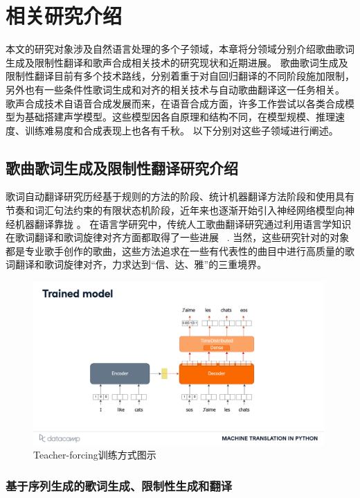 \chapter{相关研究介绍}
本文的研究对象涉及自然语言处理的多个子领域，本章将分领域分别介绍歌曲歌词生成及限制性翻译和歌声合成相关技术的研究现状和近期进展。
歌曲歌词生成及限制性翻译目前有多个技术路线，分别着重于对自回归翻译的不同阶段施加限制，另外也有一些条件性歌词生成和对齐的相关技术与自动歌曲翻译这一任务相关。
歌声合成技术自语音合成发展而来，在语音合成方面，许多工作尝试以各类合成模型为基础搭建声学模型。这些模型因各自原理和结构不同，在模型规模、推理速度、训练难易度和合成表现上也各有千秋。
以下分别对这些子领域进行阐述。
\section{歌曲歌词生成及限制性翻译研究介绍}
歌词自动翻译研究历经基于规则的方法的阶段、统计机器翻译方法阶段和使用具有节奏和词汇句法约束的有限状态机阶段\citep{spanish_verse, Manurung2004AnEA, He_Zhou_Jiang_2012}，近年来也逐渐开始引入神经网络模型向神经机器翻译靠拢
\citep{ghazvininejad-etal-2016-generating,ghazvininejad-etal-2017-hafez, ghazvininejad-etal-2018-neural}。
在语言学研究中，传统人工歌曲翻译研究通过利用语言学知识在歌词翻译和歌词旋律对齐方面都取得了一些进展
~\citep{interplay_lyrics_melody,low_2003,low2008translating,low_2022,three_d_of_singability,trans_of_music}.
当然，这些研究针对的对象都是专业歌手创作的歌曲，这些方法追求在一些有代表性的曲目中进行高质量的歌词翻译和歌词旋律对齐，力求达到``信、达、雅''的三重境界。
\begin{figure}[htbp]
  \centering
  \includegraphics[width=0.99\textwidth]{figure/related/teacher-forcing.pdf}
  \caption{Teacher-forcing训练方式图示}
  \label{fig:tf_train}
\end{figure}
\subsection{基于序列生成的歌词生成、限制性生成和翻译}
